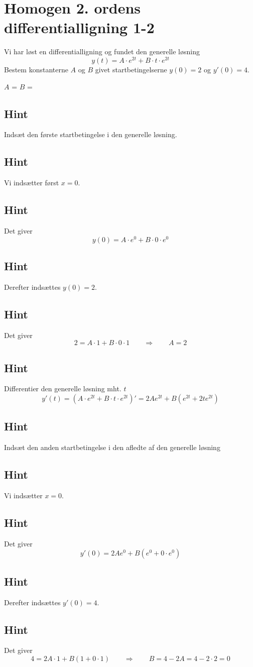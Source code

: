 \documentclass{article}
\newenvironment{exercise}[1]{\newpage\section{#1}}{}
\newcommand{\answerbox}[1]{\fbox{$#1$}}
\newcommand{\hint}{\subsection*{Hint}}
\begin{document}
\begin{exercise}{Homogen 2. ordens differentialligning 1-2}
	
	Vi har løst en differentialligning og fundet den generelle løsning
	\[
	y(t) = A \cdot e^{2t} + B \cdot t \cdot e^{2t}
	\]
	Bestem konstanterne $A$ og $B$ givet startbetingelserne $y(0)=2$ og $y'(0)=4$.
	
	
	$A$ = \answerbox{2}		$B$ = \answerbox{0}
	
	\hint
	
	Indsæt den første startbetingelse i den generelle løsning. 
	
	
	\hint
	
	Vi indsætter først $x=0$.
	
	\hint
	
	Det giver
	\[
	y(0)=  A \cdot e^{0} + B \cdot 0 \cdot e^{0}
	\]
	
	\hint
	
	Derefter indsættes $y(0)=2$.
	
	\hint 
	
	Det giver 
	\[
	2 = A \cdot 1 + B \cdot 0 \cdot 1 \qquad \Rightarrow \qquad A = 2
	\]
	
	\hint 
	
	Differentier den generelle løsning mht. $t$
	\[
	y'(t)= \left(A \cdot e^{2t} + B \cdot t \cdot e^{2t} \right)' = 2A e^{2t} + B \left( e^{2t} +2 t e^{2t} \right)
	\]
	
	\hint 
	
	Indsæt den anden startbetingelse i den afledte af den generelle løsning
	
	\hint
	
	Vi indsætter $x=0$.
	
	\hint 
	
	Det giver
	\[
	y'(0) = 2A e^{0} + B \left( e^{0} + 0 \cdot e^{0} \right)
	\]
	
	\hint 
	
	Derefter indsættes $y'(0)=4$.
	
	\hint
	
	Det giver
	\[
	4 = 2A \cdot 1 + B \left(1 + 0 \cdot 1 \right) \qquad \Rightarrow \qquad B = 4 - 2A = 4 - 2 \cdot 2 = 0
	\]
	
	
\end{exercise}

\newpage
\end{document}
